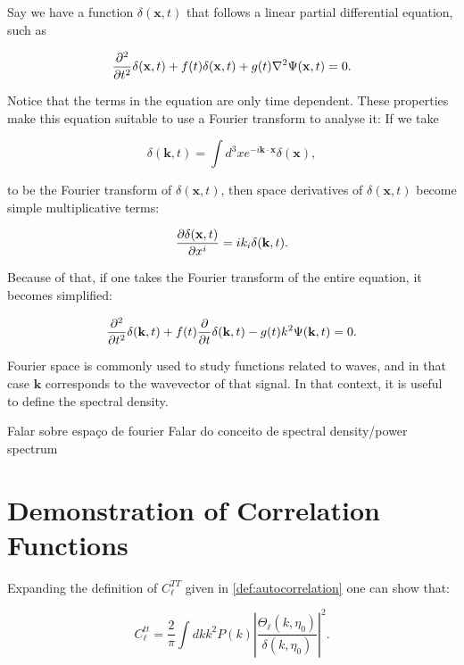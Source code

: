 \documentclass[openany,a4paper,12pt,oneside]{book}
\begin{document}
\begin{spacing}{1.5}
Say we have a function $\delta(\mathbf{x},t)$ that follows a linear partial differential equation, such as

\begin{equation}\label{Four_Space:example_diff_eq}
	\pdv[2]{}{t} \delta(\mathbf{x},t) +f(t)\delta(\mathbf{x},t) + g(t)\nabla^2\Psi(\mathbf{x},t)=0.
\end{equation}

Notice that the terms in the equation are only time dependent. These properties make this equation suitable to use a Fourier transform to analyse it: If we take

\begin{equation}
	\delta(\mathbf{k},t)=\int d^3x e^{-i\mathbf{k}\cdot \mathbf{x}}\delta(\mathbf{x}),
\end{equation}

\noindent to be the Fourier transform of $\delta(\mathbf{x},t)$, then space derivatives of $\delta(\mathbf{x},t)$ become simple multiplicative terms:

\begin{equation}
	\pdv{\delta(\mathbf{x},t)}{x^i}=ik_i\delta(\mathbf{k},t).
\end{equation}

Because of that, if one takes the Fourier transform of the entire equation, it becomes simplified:

\begin{equation}\label{Four_Space:final_eq}
	\pdv[2]{}{t}\delta(\mathbf{k},t)+f(t)\pdv{}{t}\delta(\mathbf{k},t)-g(t)k^2\Psi(\mathbf{k},t)=0.
\end{equation}

Fourier space is commonly used to study functions related to waves, and in that case $\mathbf{k}$ corresponds to the wavevector of that signal. In that context, it is useful to define the spectral density.

Falar sobre espaço de fourier
Falar do conceito de spectral density/power spectrum
\fi

\chapter{Demonstration of Correlation Functions}\label{App:correlations_demo}

Expanding the definition of $C_\ell^{TT}$ given in \eqref{def:autocorrelation} one can show that\cite{dodelson2020modern}:

\begin{equation}\label{demo:Start_eq}
	C_\ell^{tt}=\frac{2}{\pi}\int dk k^2P(k)\left|\frac{\Theta_\ell(k,\eta_0)}{\delta(k,\eta_0)}\right|^2.
\end{equation}


\end{spacing}
\end{document}
